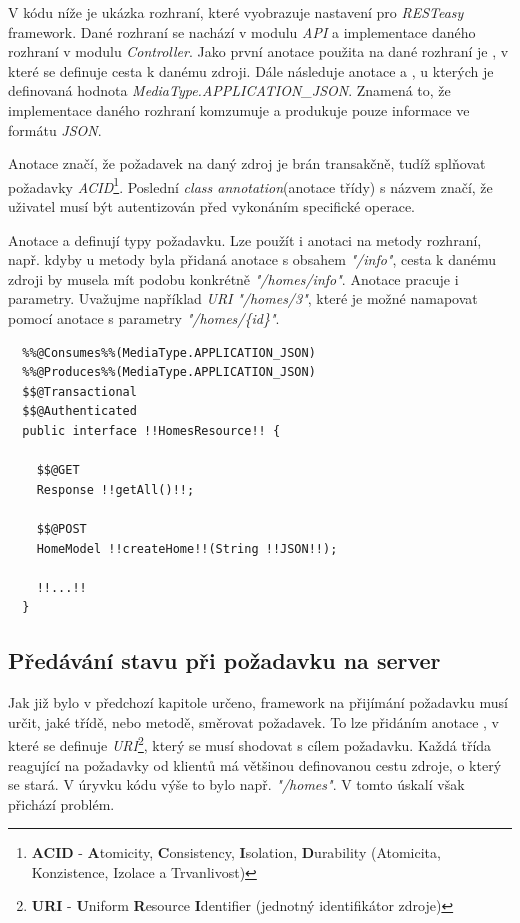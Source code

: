 V kódu níže je ukázka rozhraní, které vyobrazuje nastavení pro \emph{RESTeasy} framework.
Dané rozhraní se nachází v modulu \emph{API} a implementace daného rozhraní v modulu \emph{Controller}.
Jako první anotace použita na dané rozhraní je , v které se definuje cesta k danému zdroji.
Dále následuje anotace  a , u kterých je definovaná hodnota \emph{MediaType.APPLICATION\_JSON}.
Znamená to, že implementace daného rozhraní komzumuje a produkuje pouze informace ve formátu \emph{JSON}.

Anotace  značí, že požadavek na daný zdroj je brán transakčně, tudíž splňovat požadavky \emph{ACID}\footnote{\textbf{ACID} - \textbf{A}tomicity, \textbf{C}onsistency, \textbf{I}solation, \textbf{D}urability (Atomicita, Konzistence, Izolace a Trvanlivost)}.
Poslední \emph{class annotation}(anotace třídy) s názvem  značí, že uživatel musí být autentizován před vykonáním specifické operace.

Anotace  a  definují typy požadavku.
Lze použít i anotaci  na metody rozhraní, např. kdyby u metody byla přidaná anotace  s obsahem \emph{"/info"}, cesta k danému zdroji
by musela mít podobu konkrétně \emph{"/homes/info"}.
Anotace  pracuje i parametry.
Uvažujme například \emph{URI} \emph{"/homes/3"}, které je možné namapovat pomocí anotace  s parametry \emph{"/homes/\{id\}"}.

\begin{lstlisting}[style=JavaStyle, caption={Ukázka deklarování rozhraní pro správu domácností}]
  %%@Path%%("/homes")
  %%@Consumes%%(MediaType.APPLICATION_JSON)
  %%@Produces%%(MediaType.APPLICATION_JSON)
  $$@Transactional
  $$@Authenticated
  public interface !!HomesResource!! {

    $$@GET
    Response !!getAll()!!;

    $$@POST
    HomeModel !!createHome!!(String !!JSON!!);

    !!...!!
  }
\end{lstlisting}

\subsection*{Předávání stavu při požadavku na server}
\label{impl:backend:state}

Jak již bylo v předchozí kapitole určeno, framework na přijímání požadavku musí určit, jaké třídě, nebo metodě, směrovat požadavek.
To lze přidáním anotace , v které se definuje \emph{URI}\footnote{\textbf{URI} - \textbf{U}niform \textbf{R}esource \textbf{I}dentifier (jednotný identifikátor zdroje)}, který se musí shodovat s cílem požadavku.
Každá třída reagující na požadavky od klientů má většinou definovanou cestu zdroje, o který se stará.
V úryvku kódu výše to bylo např. \emph{"/homes"}.
V tomto úskalí však přichází problém.

